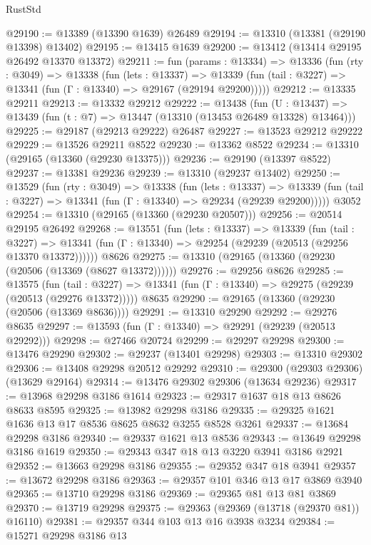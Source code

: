 \begin{lexlean}{RustStd}
\begin{coremodule}
@29190 := @13389 (@13390 @1639) @26489
@29194 := @13310 (@13381 (@29190 @13398) @13402)
@29195 := @13415 @1639
@29200 := @13412 (@13414 @29195 @26492 @13370 @13372)
@29211 := fun (params : @13334) =>
  @13336
    (fun (rty : @3049) =>
    @13338
      (fun (lets : @13337) =>
      @13339 (fun (tail : @3227) => @13341 (fun (Γ : @13340) => @29167 (@29194 @29200)))))
@29212 := @13335 @29211
@29213 := @13332 @29212
@29222 := @13438
    (fun (U : @13437) => @13439 (fun (t : @7) => @13447 (@13310 (@13453 @26489 @13328) @13464)))
@29225 := @29187 (@29213 @29222) @26487
@29227 := @13523 @29212 @29222
@29229 := @13526 @29211 @8522
@29230 := @13362 @8522
@29234 := @13310 (@29165 (@13360 (@29230 @13375)))
@29236 := @29190 (@13397 @8522)
@29237 := @13381 @29236
@29239 := @13310 (@29237 @13402)
@29250 := @13529
    (fun (rty : @3049) =>
    @13338
      (fun (lets : @13337) =>
      @13339 (fun (tail : @3227) => @13341 (fun (Γ : @13340) => @29234 (@29239 @29200)))))
    @3052
@29254 := @13310 (@29165 (@13360 (@29230 @20507)))
@29256 := @20514 @29195 @26492
@29268 := @13551
    (fun (lets : @13337) =>
    @13339
      (fun (tail : @3227) =>
      @13341 (fun (Γ : @13340) => @29254 (@29239 (@20513 (@29256 @13370 @13372))))))
    @8626
@29275 := @13310 (@29165 (@13360 (@29230 (@20506 (@13369 (@8627 @13372))))))
@29276 := @29256 @8626
@29285 := @13575
    (fun (tail : @3227) => @13341 (fun (Γ : @13340) => @29275 (@29239 (@20513 (@29276 @13372)))))
    @8635
@29290 := @29165 (@13360 (@29230 (@20506 (@13369 @8636))))
@29291 := @13310 @29290
@29292 := @29276 @8635
@29297 := @13593 (fun (Γ : @13340) => @29291 (@29239 (@20513 @29292)))
@29298 := @27466 @20724
@29299 := @29297 @29298
@29300 := @13476 @29290
@29302 := @29237 (@13401 @29298)
@29303 := @13310 @29302
@29306 := @13408 @29298 @20512 @29292
@29310 := @29300 (@29303 @29306) (@13629 @29164)
@29314 := @13476 @29302 @29306 (@13634 @29236)
@29317 := @13968 @29298 @3186 @1614
@29323 := @29317 @1637 @18 @13 @8626 @8633 @8595
@29325 := @13982 @29298 @3186
@29335 := @29325 @1621 @1636 @13 @17 @8536 @8625 @8632 @3255 @8528 @3261
@29337 := @13684 @29298 @3186
@29340 := @29337 @1621 @13 @8536
@29343 := @13649 @29298 @3186 @1619
@29350 := @29343 @347 @18 @13 @3220 @3941 @3186 @2921
@29352 := @13663 @29298 @3186
@29355 := @29352 @347 @18 @3941
@29357 := @13672 @29298 @3186
@29363 := @29357 @101 @346 @13 @17 @3869 @3940
@29365 := @13710 @29298 @3186
@29369 := @29365 @81 @13 @81 @3869
@29370 := @13719 @29298
@29375 := @29363 (@29369 (@13718 (@29370 @81)) @16110)
@29381 := @29357 @344 @103 @13 @16 @3938 @3234
@29384 := @15271 @29298 @3186 @13

\end{coremodule}
\end{lexlean}
